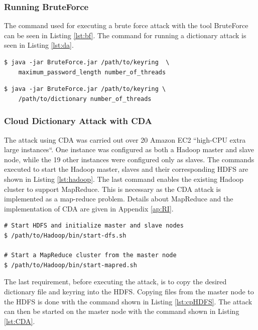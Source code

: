 \documentclass[pdftex,english,10pt,b5paper,twoside]{book}
\begin{document}
\subsubsection{Running BruteForce}
The command used for executing a brute force attack with the tool BruteForce
can be seen in Listing \ref{lst:bf}. The command for running a dictionary
attack is seen in Listing \ref{lst:da}. 

\lstset{label=lst:bf, caption=Running local brute force attack}
\begin{lstlisting}
$ java -jar BruteForce.jar /path/to/keyring  \
    maximum_password_length number_of_threads
\end{lstlisting}

\lstset{label=lst:da, caption=Running local dictionary attack}
\begin{lstlisting}
$ java -jar BruteForce.jar /path/to/keyring \
    /path/to/dictionary number_of_threads
\end{lstlisting}

\subsubsection{Cloud Dictionary Attack with \ac{CDA}} The attack using \ac{CDA}
was carried out over 20 Amazon EC2 ``high-CPU extra large instances``. One
instance was configured as both a Hadoop master and slave node, while the 19
other instances were configured only as slaves. The commands executed to start
the Hadoop master, slaves and their corresponding \ac{HDFS} are shown in
Listing \ref{lst:hadoop}. The last command enables the existing Hadoop cluster
to support MapReduce. This is necessary as the \ac{CDA} attack is implemented
as a map-reduce problem. Details about MapReduce and the implementation of
\ac{CDA} are given in Appendix \ref{ap:RI}.\\

\lstset{language=bash, label=lst:hadoop, caption=Starting Hadoop cluster with HDFS}
\begin{lstlisting}
# Start HDFS and initialize master and slave nodes
$ /path/to/Hadoop/bin/start-dfs.sh

# Start a MapReduce cluster from the master node
$ /path/to/Hadoop/bin/start-mapred.sh
\end{lstlisting}

\noindent The last requirement, before executing the attack, is to copy the
desired dictionary file and keyring into the \ac{HDFS}. Copying files from the
master node to the \ac{HDFS} is done with the command shown in Listing
\ref{lst:cpHDFS}. The attack can then be started on the master node with the
command shown in Listing \ref{lst:CDA}. 
\end{document}

